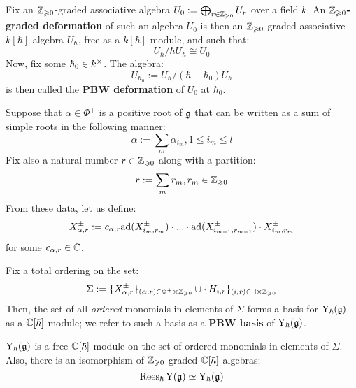         \begin{definition} \label{def: graded_and_PBW_deformations}
            Fix an $\mathbb{Z}_{\geqslant 0}$-graded associative algebra $U_0 := \bigoplus_{r \in \mathbb{Z}_{\geqslant 0}} U_r$ over a field $k$. An \textbf{$\mathbb{Z}_{\geqslant 0}$-graded deformation} of such an algebra $U_0$ is then an $\mathbb{Z}_{\geqslant 0}$-graded associative $k[\hbar]$-algebra $U_{\hbar}$, free as a $k[\hbar]$-module, and such that:
                $$U_{\hbar}/\hbar U_{\hbar} \cong U_0$$
            Now, fix some $\hbar_0 \in k^{\x}$. The algebra:
                $$U_{\hbar_0} := U_{\hbar}/(\hbar - \hbar_0)U_{\hbar}$$
            is then called the \textbf{PBW deformation} of $U_0$ at $\hbar_0$.  
        \end{definition}
        \begin{convention}
            Suppose that $\alpha \in \Phi^+$ is a positive root of $\mathfrak{g}$ that can be written as a sum of simple roots in the following manner:
                $$\alpha := \sum_m \alpha_{i_m}, 1 \leq i_m \leq l$$
            Fix also a natural number $r \in \mathbb{Z}_{\geqslant 0}$ along with a partition:
                $$r := \sum_m r_m, r_m \in \mathbb{Z}_{\geqslant 0}$$
            From these data, let us define:
                $$X_{\alpha, r}^{\pm} := c_{\alpha, r} \mathrm{ad}( X_{i_m, r_m}^{\pm} ) \cdot ... \cdot \mathrm{ad}( X_{i_{m - 1}, r_{m - 1}}^{\pm} ) \cdot X_{i_m, r_m}^{\pm}$$
            for some $c_{\alpha, r} \in \mathbb{C}$.
        \end{convention}
        \begin{theorem} \label{theorem: PBW_bases_for_formal_yangians}
            Fix a total ordering on the set:
                $$\Sigma := \{X_{\alpha, r}^{\pm}\}_{(\alpha, r) \in \Phi^+ \x \Z_{\geq 0}} \cup \{H_{i, r}\}_{(i, r) \in \simpleroots \x \Z_{\geq 0}}$$
            Then, the set of all \textit{ordered} monomials in elements of $\Sigma$ forms a basis for $\mathrm{Y}_{\hbar}(\mathfrak{g})$ as a $\mathbb{C}[\hbar]$-module; we refer to such a basis as a \textbf{PBW basis} of $\mathrm{Y}_{\hbar}(\mathfrak{g})$. 
        \end{theorem}
        \begin{corollary} \label{coro: formal_yangians_as_graded_deformations}
            $\mathrm{Y}_{\hbar}(\mathfrak{g})$ is a free $\mathbb{C}[\hbar]$-module on the set of ordered monomials in elements of $\Sigma$. Also, there is an isomorphism of $\mathbb{Z}_{\geqslant 0}$-graded $\mathbb{C}[\hbar]$-algebras:
                $$\operatorname{Rees}_{\hbar} \mathrm{Y}(\mathfrak{g}) \simeq \mathrm{Y}_{\hbar}(\mathfrak{g})$$
        \end{corollary}

